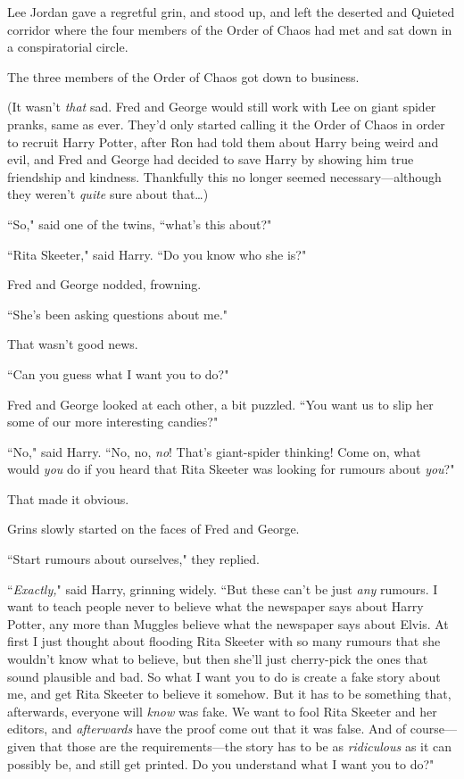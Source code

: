 Lee Jordan gave a regretful grin, and stood up, and left the deserted and Quieted corridor where the four members of the Order of Chaos had met and sat down in a conspiratorial circle.

The three members of the Order of Chaos got down to business.

(It wasn't \emph{that} sad. Fred and George would still work with Lee on giant spider pranks, same as ever. They'd only started calling it the Order of Chaos in order to recruit Harry Potter, after Ron had told them about Harry being weird and evil, and Fred and George had decided to save Harry by showing him true friendship and kindness. Thankfully this no longer seemed necessary—although they weren't \emph{quite} sure about that{\ldots})

``So," said one of the twins, ``what's this about?"

``Rita Skeeter," said Harry. ``Do you know who she is?"

Fred and George nodded, frowning.

``She's been asking questions about me."

That wasn't good news.

``Can you guess what I want you to do?"

Fred and George looked at each other, a bit puzzled. ``You want us to slip her some of our more interesting candies?"

``No," said Harry. ``No, no, \emph{no}! That's giant-spider thinking! Come on, what would \emph{you} do if you heard that Rita Skeeter was looking for rumours about \emph{you}?"

That made it obvious.

Grins slowly started on the faces of Fred and George.

``Start rumours about ourselves," they replied.

``\emph{Exactly,}" said Harry, grinning widely. ``But these can't be just \emph{any} rumours. I want to teach people never to believe what the newspaper says about Harry Potter, any more than Muggles believe what the newspaper says about Elvis. At first I just thought about flooding Rita Skeeter with so many rumours that she wouldn't know what to believe, but then she'll just cherry-pick the ones that sound plausible and bad. So what I want you to do is create a fake story about me, and get Rita Skeeter to believe it somehow. But it has to be something that, afterwards, everyone will \emph{know} was fake. We want to fool Rita Skeeter and her editors, and \emph{afterwards} have the proof come out that it was false. And of course—given that those are the requirements—the story has to be as \emph{ridiculous} as it can possibly be, and still get printed. Do you understand what I want you to do?"


